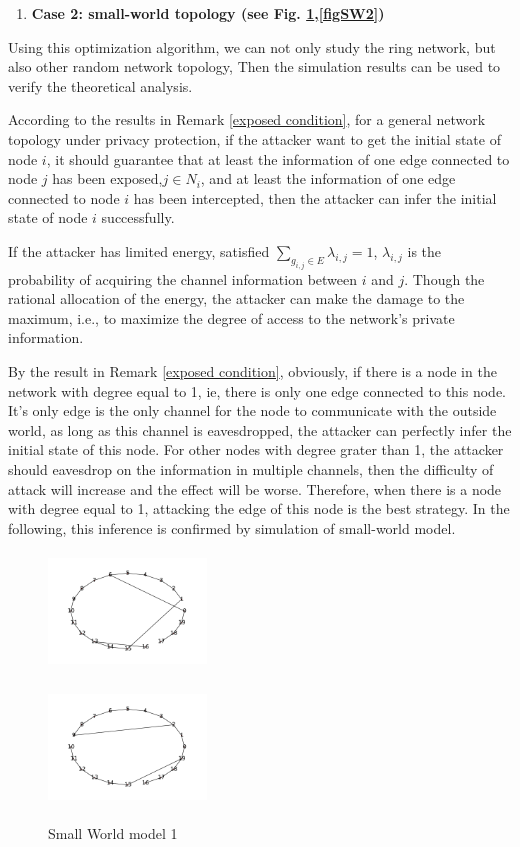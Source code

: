 \documentclass[10pt,journal,compsoc]{IEEEtran}
\begin{document}
\begin{enumerate}[2)]
\item \textbf{Case 2: small-world topology (see Fig. \ref{figSW1},\ref{figSW2})}
\end{enumerate}

Using this optimization algorithm, we can not only study the ring network, but also other random network topology, Then the simulation results can be used to verify the theoretical analysis.

According to the results in Remark \ref{exposed condition}, for a general network topology under privacy protection, if the attacker want to get the initial state of node $i$, it should guarantee that at least the information of one edge connected to node $j$ has been exposed,$j\in N_i$, and at least the information of one edge connected to node $i$ has been intercepted, then the attacker can infer the initial state of node $i$ successfully.

If the attacker has limited energy, satisfied  $\sum_{g_{i,j}\in E}\lambda_{i, j}=1$, $\lambda_{i,j}$ is the probability of acquiring the channel information between $i$ and $j$. Though the rational allocation of the energy, the attacker can make the damage to the maximum, i.e., to maximize the degree of access to the network's private information.

By the result in Remark \ref{exposed condition}, obviously, if there is a node in the network with degree equal to 1, ie, there is only one edge connected to this node. It's only edge is the only channel for the node to communicate with the outside world, as long as this channel is eavesdropped, the attacker can perfectly infer the initial state of this node. For other nodes with degree grater than 1, the attacker should eavesdrop on the information in multiple channels, then the difficulty of attack will increase and the effect will be worse. Therefore, when there is a node with degree equal to 1, attacking the edge of this node is the best strategy. In the following, this inference is confirmed by simulation of small-world model.
\begin{figure}[!htb]
 \parbox[b]{.25\textwidth}{\centering
 \includegraphics[width=4.2cm, height = 3.1cm]{k2p1-a}
 \subcaption{}\label{SW1-a}}%
 \parbox[b]{.25\textwidth}{\centering
 \includegraphics[width=4.2cm, height= 3.1cm]{k2p1-b}
 \subcaption{}\label{SW1-b}}
 \caption{Small World model 1}
 \label{figSW1}
\end{figure}
\end{document}
